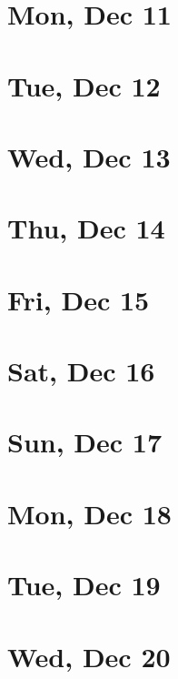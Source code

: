 	\section{Mon, Dec 11}
		
	\section{Tue, Dec 12}
		
	\section{Wed, Dec 13}
		
	\section{Thu, Dec 14}
		
	\section{Fri, Dec 15}
		
	\section{Sat, Dec 16}
		
	\section{Sun, Dec 17}
		
	\section{Mon, Dec 18}
		
	\section{Tue, Dec 19}
		
	\section{Wed, Dec 20}
		

